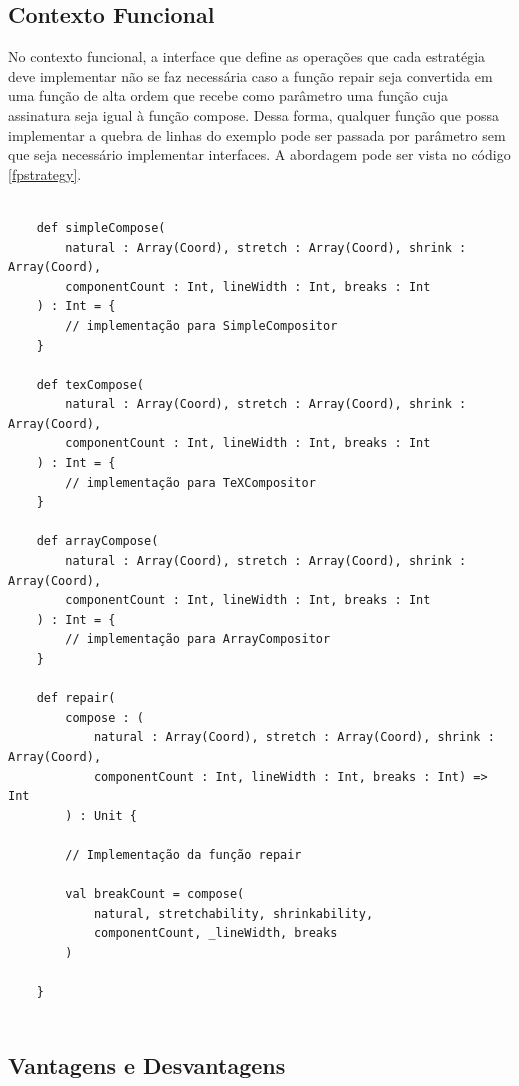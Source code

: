 \subsection*{Contexto Funcional}

No contexto funcional, a interface que define 
as operações que cada estratégia deve implementar 
não se faz necessária caso a função repair seja 
convertida em uma função de alta ordem que recebe 
como parâmetro uma função cuja assinatura seja 
igual à função compose. Dessa forma, qualquer 
função que possa implementar a quebra de linhas 
do exemplo pode ser passada por parâmetro sem 
que seja necessário implementar interfaces. 
A abordagem pode ser vista no código \ref{fpstrategy}.


\begin{lstlisting}[caption={Strategy Funcional},label=fpstrategy]
    
    def simpleCompose(
        natural : Array(Coord), stretch : Array(Coord), shrink : Array(Coord),
        componentCount : Int, lineWidth : Int, breaks : Int
    ) : Int = {
        // implementação para SimpleCompositor
    }

    def texCompose(
        natural : Array(Coord), stretch : Array(Coord), shrink : Array(Coord),
        componentCount : Int, lineWidth : Int, breaks : Int
    ) : Int = {
        // implementação para TeXCompositor
    }

    def arrayCompose(
        natural : Array(Coord), stretch : Array(Coord), shrink : Array(Coord),
        componentCount : Int, lineWidth : Int, breaks : Int
    ) : Int = {
        // implementação para ArrayCompositor
    }

    def repair(
        compose : (
            natural : Array(Coord), stretch : Array(Coord), shrink : Array(Coord),
            componentCount : Int, lineWidth : Int, breaks : Int) => Int
        ) : Unit {
        
        // Implementação da função repair
    
        val breakCount = compose(
            natural, stretchability, shrinkability,
            componentCount, _lineWidth, breaks
        )

    }
        

\end{lstlisting}


\subsection*{Vantagens e Desvantagens}


